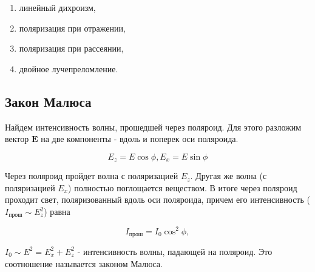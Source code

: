 \begin{enumerate}
    \item линейный дихроизм,
    \item поляризация при отражении,
    \item поляризация при рассеянии,
    \item двойное лучепреломление.
\end{enumerate}

\subsection{Закон Малюса}

Найдем интенсивность волны, прошедшей через поляроид. Для этого разложим вектор $\textbf{E}$ на две компоненты - вдоль и поперек оси поляроида.

\begin{equation*}
    E_z = E\cos \phi, E_x = E\sin \phi
\end{equation*}

Через поляроид пройдет волна с поляризацией $E_z$. Другая же волна (с поляризацией $E_x$) полностью поглощается веществом. В итоге через поляроид проходит свет, поляризованный вдоль оси поляроида, причем его интенсивность ($I_{\text{прош}} \sim E_z^2$) равна

\begin{equation*}
    I_{\text{прош}} = I_0 \cos^2 \phi,
\end{equation*}

$I_0 \sim E^2 = E_x^2 + E_z^2$ - интенсивность волны, падающей на поляроид. Это соотношение называется законом Малюса.



